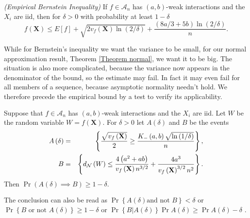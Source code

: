 \documentclass[final,12pt]{colt2018} %
\begin{document}
		\begin{theorem}
			\label{Theorem empirical Bernstein Bound}{\em (Empirical Bernstein Inequality)}
			If $f\in \mathcal{A}_{n}$ has $\left( a,b\right) $-weak interactions and the 
			$X_{i}$ are iid, then for $\delta >0$ with probability at least $1-\delta $%
			\begin{equation*}
			f\left( \mathbf{X}\right) \leq E\left[ f\right] +\sqrt{2v_{f}\left( \mathbf{X%
				}\right) \ln \left( 2/\delta \right) }+\frac{\left( 8a/3+5b\right) \ln
				\left( 2/\delta \right) }{n}. 
			\end{equation*}
		\end{theorem}
		
		While for Bernstein's inequality we want the variance to be small, for our
		normal approximation result, Theorem \ref{Theorem normal}, we want it to be
		big. The situation is also more complicated, because the variance now
		appears in the denominator of the bound, so the estimate may fail. In fact
		it may even fail for all members of a sequence, because asymptotic normality
		needn't hold. We therefore precede the empirical bound by a test to verify
		its applicability.
		
		\begin{theorem}
			\label{Theorem empirical normal approximation}Suppose that $f\in \mathcal{A}%
			_{n}$ has $\left( a,b\right) $-weak interactions and the $X_{i}$ are iid.
			Let $W$ be the random variable $W= f\left( \mathbf{X}\right)$. For $\delta >0$ let $A\left( \delta \right) $ and $B$ be the events 
			\begin{eqnarray*}
				A\left( \delta \right) &=&\left\{ \frac{\sqrt{v_{f}\left( \mathbf{X}\right) }%
				}{2}\geq \frac{K_{-}\left( a,b\right) \sqrt{\ln \left( 1/\delta \right) }}{n}%
				\right\} , \\
				B &=&\left\{ d_{\mathcal{N}}\left( W \right) \leq 
				\frac{4\left( a^{2}+ab\right) }{v_{f}\left( \mathbf{X}\right) n^{3/2}}+\frac{%
					4a^{3}}{v_{f}\left( \mathbf{X}\right) ^{3/2}n^{2}}\right\} .
			\end{eqnarray*}%
			Then $\Pr \left( A\left( \delta \right) \implies B\right) \geq 1-\delta $.
		\end{theorem}
		
		The conclusion can also be read as $\Pr \left\{ A\left( \delta \right) \text{
			and not }B\right\} <\delta $ or $\Pr \left\{ B\text{ or not }A\left( \delta
		\right) \right\} \geq 1-\delta $ or $\Pr \left\{ B|A\left( \delta \right)
		\right\} \Pr A\left( \delta \right) \geq \Pr A\left( \delta \right) -\delta $%
		.
		
\end{document}
